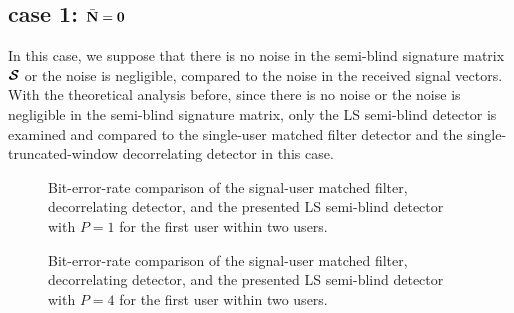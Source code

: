 \documentclass[a4paper,10pt,fleqn, twocolumn]{IEEETran}
\newcommand{\bN}{{\bf N}}
\newcommand{\bcS}{{\mbox {\boldmath ${\cal S}$}}}
\begin{document}
\subsection*{case 1: $\bar{\bN} = \mathbf{0}$}

In this case, we suppose that there is no noise in the semi-blind
signature matrix $\bcS$ or the noise is negligible, compared to
the noise in the received signal vectors. With the theoretical
analysis before, since there is no noise or the noise is
negligible in the semi-blind signature matrix, only the LS
semi-blind detector is examined and compared to the single-user
matched filter detector and the single-truncated-window
decorrelating detector in this case.

\begin{figure}
\caption{Bit-error-rate comparison of the signal-user matched
filter, decorrelating detector, and the presented LS semi-blind
detector with $P=1$ for the first user within two users.}
\label{LS10}
\end{figure}

\begin{figure}
\caption{Bit-error-rate comparison of the signal-user matched
filter, decorrelating detector, and the presented LS semi-blind
detector with $P=4$ for the first user within two users.}
\label{LS40}
\end{figure}
\end{document}
